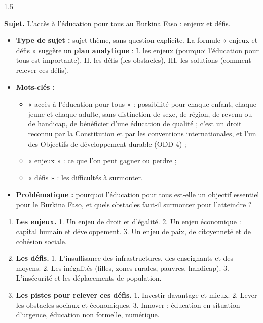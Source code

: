 \documentclass[12pt]{article}
\begin{document}
\begin{spacing}{1.5}

\noindent\textbf{Sujet.} L'accès à l'éducation pour tous au Burkina Faso : enjeux et défis.


\begin{itemize}
\item \textbf{Type de sujet :} sujet-thème, sans question explicite. La formule « enjeux et défis » suggère un \textbf{plan analytique} : I. les enjeux (pourquoi l'éducation pour tous est importante), II. les défis (les obstacles), III. les solutions (comment relever ces défis).
\item \textbf{Mots-clés :}
  \begin{itemize}
  \item « accès à l'éducation pour tous » : possibilité pour chaque enfant, chaque jeune et chaque adulte, sans distinction de sexe, de région, de revenu ou de handicap, de bénéficier d'une éducation de qualité ; c'est un droit reconnu par la Constitution et par les conventions internationales, et l'un des Objectifs de développement durable (ODD 4) ;
  \item « enjeux » : ce que l'on peut gagner ou perdre ;
  \item « défis » : les difficultés à surmonter.
  \end{itemize}
\item \textbf{Problématique :} pourquoi l'éducation pour tous est-elle un objectif essentiel pour le Burkina Faso, et quels obstacles faut-il surmonter pour l'atteindre ?
\end{itemize}


\begin{enumerate}
\item[I.] \textbf{Les enjeux.} 1. Un enjeu de droit et d'égalité. 2. Un enjeu économique : capital humain et développement. 3. Un enjeu de paix, de citoyenneté et de cohésion sociale.
\item[II.] \textbf{Les défis.} 1. L'insuffisance des infrastructures, des enseignants et des moyens. 2. Les inégalités (filles, zones rurales, pauvres, handicap). 3. L'insécurité et les déplacements de population.
\item[III.] \textbf{Les pistes pour relever ces défis.} 1. Investir davantage et mieux. 2. Lever les obstacles sociaux et économiques. 3. Innover : éducation en situation d'urgence, éducation non formelle, numérique.
\end{enumerate}


\end{spacing}
\end{document}
